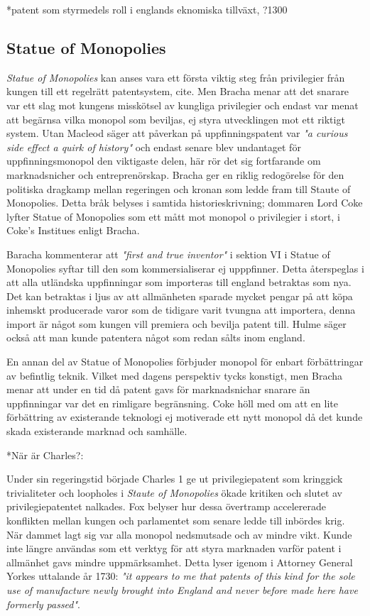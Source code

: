 *patent som styrmedels roll i englands eknomiska tillväxt, ?1300

\subsection{Statue of Monopolies} 
\label{sub:statue_of_monopolies}

\emph{Statue of Monopolies} kan anses vara ett första viktig steg från privilegier från kungen till ett
regelrätt patentsystem, cite. Men Bracha\cite{bracha} menar att det snarare var ett slag mot kungens misskötsel av kungliga privilegier
och endast var menat att begärnsa vilka monopol som beviljas, ej styra utvecklingen mot ett riktigt
system. Utan Macleod \cite{macleod2} säger att påverkan på uppfinningspatent  var \emph{"a curious side effect a quirk of history"} och endast
senare blev undantaget för uppfinningsmonopol den viktigaste delen, här rör det sig fortfarande om marknadsnicher och entreprenörskap. Bracha ger en riklig redogörelse för den politiska dragkamp mellan regeringen och kronan som ledde fram till Staute of Monopolies. Detta bråk belyses i samtida historieskrivning; dommaren Lord Coke lyfter Statue of Monopolies som ett mått mot monopol o privilegier i stort, i Coke's Institues \cite{coke} enligt Bracha\cite{bracha}.

Baracha kommenterar att \emph{"first and true inventor"} i sektion VI i Statue of Monopolies syftar till den som kommersialiserar ej upppfinner. Detta återspeglas i att alla utländska uppfinningar som importeras till england betraktas som nya\cite{bracha}. Det kan betraktas i ljus av att allmänheten sparade mycket pengar på att köpa inhemskt producerade varor som de tidigare varit tvungna att importera, denna import är något som kungen vill premiera och bevilja patent till. Hulme\cite{hulme2} säger också att man kunde patentera något som redan sålts inom england.  

En annan del av Statue of Monopolies förbjuder monopol för enbart förbättringar av befintlig teknik. Vilket med dagens perspektiv tycks konstigt, men Bracha\cite{bracha} menar att under en tid då patent gavs för marknadsnichar snarare än uppfinningar var det en rimligare begränsning.
Coke höll med om att en lite förbättring av existerande teknologi ej motiverade ett nytt monopol då det kunde skada existerande marknad och samhälle\cite{bracha}.

*När är Charles?:

Under sin regeringstid började Charles 1 ge ut privilegiepatent som kringgick trivialiteter och loopholes i \emph{Staute of
Monopolies} ökade kritiken och slutet av privilegiepatentet nalkades\cite{bracha}. Fox \cite{Fox} belyser hur dessa övertramp accelererade
konflikten mellan kungen och parlamentet som senare ledde till inbördes krig. När dammet lagt sig
var alla monopol nedsmutsade och av mindre vikt. Kunde inte längre användas som ett verktyg för att styra
marknaden varför patent i allmänhet gavs mindre uppmärksamhet. Detta lyser igenom i Attorney General Yorkes uttalande år 1730: \emph{"it appears to me that patents of this kind for the sole use of manufacture newly brought into England and never before made here have formerly passed"}\cite{macleod2}. 

